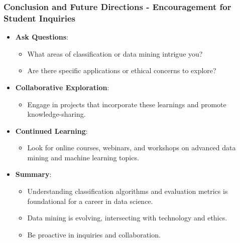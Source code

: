 \documentclass[aspectratio=169]{beamer}
\begin{document}
\begin{frame}[fragile]
    \frametitle{Conclusion and Future Directions - Encouragement for Student Inquiries}
    \begin{itemize}
        \item \textbf{Ask Questions}: 
        \begin{itemize}
            \item What areas of classification or data mining intrigue you? 
            \item Are there specific applications or ethical concerns to explore?
        \end{itemize}
        
        \item \textbf{Collaborative Exploration}: 
        \begin{itemize}
            \item Engage in projects that incorporate these learnings and promote knowledge-sharing.
        \end{itemize}
        
        \item \textbf{Continued Learning}: 
        \begin{itemize}
            \item Look for online courses, webinars, and workshops on advanced data mining and machine learning topics.
        \end{itemize}
        
        \item \textbf{Summary}: 
        \begin{itemize}
            \item Understanding classification algorithms and evaluation metrics is foundational for a career in data science.
            \item Data mining is evolving, intersecting with technology and ethics.
            \item Be proactive in inquiries and collaboration.
        \end{itemize}
    \end{itemize}
\end{frame}
\end{document}
